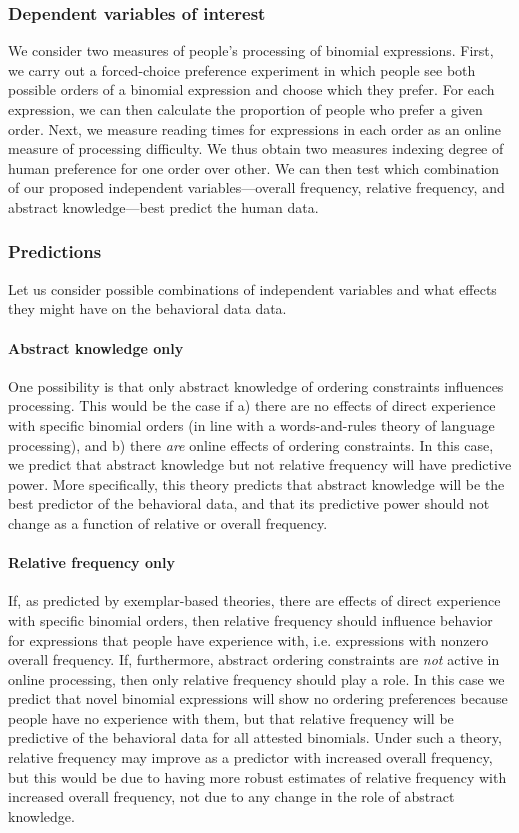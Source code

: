 \documentclass[authoryear]{elsarticle}
\begin{document}
\subsubsection{Dependent variables of interest}

We consider two measures of people's processing of binomial expressions. First, we carry out a forced-choice preference experiment in which people see both possible orders of a binomial expression and choose which they prefer. For each expression, we can then calculate the proportion of people who prefer a given order. Next, we measure reading times for expressions in each order as an online measure of processing difficulty. We thus obtain two measures indexing degree of human preference for one order over other. We can then test which combination of our proposed independent variables---overall frequency, relative frequency, and abstract knowledge---best predict the human data.

\subsubsection{Predictions}\label{predictions}
Let us consider possible combinations of independent variables and what effects they might have on the behavioral data data.

\paragraph{Abstract knowledge only}
One possibility is that only abstract knowledge of ordering constraints influences processing. This would be the case if a) there are no effects of direct experience with specific binomial orders (in line with a words-and-rules theory of language processing), and b) there \emph{are} online effects of ordering constraints. In this case, we predict that abstract knowledge but not relative frequency will have predictive power. More specifically, this theory predicts that abstract knowledge will be the best predictor of the behavioral data, and that its predictive power should not change as a function of relative or overall frequency.

\paragraph{Relative frequency only}
If, as predicted by exemplar-based theories, there are effects of direct experience with specific binomial orders, then relative frequency should influence behavior for expressions that people have experience with, i.e. expressions with nonzero overall frequency. If, furthermore, abstract ordering constraints are \emph{not} active in online processing, then only relative frequency should play a role. In this case we predict that novel binomial expressions will show no ordering preferences because people have no experience with them, but that relative frequency will be predictive of the behavioral data for all attested binomials. Under such a theory, relative frequency may improve as a predictor with increased overall frequency, but this would be due to having more robust estimates of relative frequency with increased overall frequency, not due to any change in the role of abstract knowledge.
\end{document}
